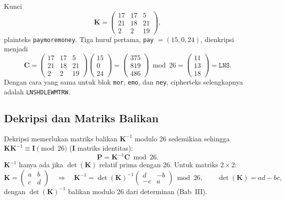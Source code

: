 \begin{contoh}
Kunci
\[
\mathbf{K} = \begin{pmatrix} 17 & 17 & 5 \\ 21 & 18 & 21 \\ 2 & 2 & 19 \end{pmatrix},
\]
plainteks \texttt{paymoremoney}. Tiga huruf pertama, \texttt{pay} $= (15, 0, 24)$, dienkripsi menjadi
\[
\mathbf{C} = \begin{pmatrix} 17 & 17 & 5 \\ 21 & 18 & 21 \\ 2 & 2 & 19 \end{pmatrix}
\begin{pmatrix} 15 \\ 0 \\ 24 \end{pmatrix}
= \begin{pmatrix} 375 \\ 819 \\ 486 \end{pmatrix} \bmod 26
= \begin{pmatrix} 11 \\ 13 \\ 18 \end{pmatrix} = \texttt{LNS}.
\]
Dengan cara yang sama untuk blok \texttt{mor}, \texttt{emo}, dan \texttt{ney}, cipherteks selengkapnya adalah \texttt{LNSHDLEWMTRW}.
\end{contoh}

\subsection{Dekripsi dan Matriks Balikan}

Dekripsi memerlukan matriks balikan $\mathbf{K}^{-1}$ modulo 26 sedemikian sehingga $\mathbf{K}\mathbf{K}^{-1} \equiv \mathbf{I} \pmod{26}$ ($\mathbf{I}$ matriks identitas):
\[
\mathbf{P} = \mathbf{K}^{-1}\mathbf{C} \bmod 26.
\]
$\mathbf{K}^{-1}$ hanya ada jika $\det(\mathbf{K})$ relatif prima dengan 26. Untuk matriks $2 \times 2$:
\[
\mathbf{K} = \begin{pmatrix} a & b \\ c & d \end{pmatrix}
\quad \Rightarrow \quad
\mathbf{K}^{-1} = \det(\mathbf{K})^{-1} \begin{pmatrix} d & -b \\ -c & a \end{pmatrix} \bmod 26,
\qquad \det(\mathbf{K}) = ad - bc,
\]
dengan $\det(\mathbf{K})^{-1}$ balikan modulo 26 dari determinan (Bab~III).

